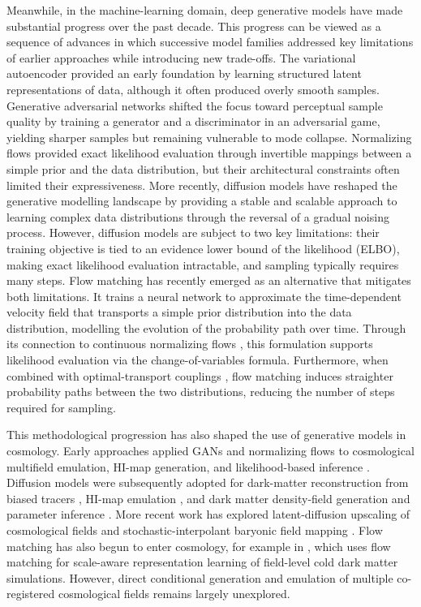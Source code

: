 \documentclass{article}
\begin{document}
Meanwhile, in the machine-learning domain, deep generative models
have made substantial progress over the past decade. This progress
can be viewed as a sequence of advances in which successive model
families addressed key limitations of earlier approaches while
introducing new trade-offs. The variational autoencoder \citep[VAE;][]{Kingma2014} 
provided an early foundation by learning structured latent representations of
data, although it often produced overly smooth samples. Generative adversarial networks
\citep[GANs;][]{Goodfellow2014} shifted the focus toward perceptual
sample quality by training a generator and a discriminator in an
adversarial game, yielding sharper samples but
remaining vulnerable to mode collapse. Normalizing flows \citep{RezendeMohamed2015}
provided exact likelihood evaluation through invertible mappings
between a simple prior and the data distribution, but their
architectural constraints often limited their expressiveness.
More recently, diffusion models \citep{Ho2020,Song2021} have reshaped the generative modelling 
landscape by providing a stable and scalable approach to learning complex data
distributions through the reversal of a gradual noising process. 
However, diffusion models are subject to two key limitations: 
their training objective is tied to an evidence lower bound of the likelihood (ELBO), 
making exact likelihood evaluation intractable, and sampling typically requires many steps.
Flow matching \citep{Lipman2023} has recently emerged as an
alternative that mitigates both limitations. It trains a
neural network to approximate the time-dependent velocity field that
transports a simple prior distribution into the data distribution,
modelling the evolution of the probability path over time. Through
its connection to continuous normalizing flows \citep{Chen2018}, this
formulation supports likelihood evaluation via the
change-of-variables formula. Furthermore, when combined with
optimal-transport couplings \citep{Lipman2023}, flow matching induces
straighter probability paths between the two distributions, reducing
the number of steps required for sampling.

This methodological progression has also shaped the use of generative
models in cosmology. Early approaches applied GANs and normalizing
flows to cosmological multifield emulation, HI-map generation, and
likelihood-based inference
\citep{Andrianomena2022,Andrianomena2024,Hassan2021HIFlow,Friedman2022HIGlow}.
Diffusion models were subsequently adopted for dark-matter
reconstruction from biased tracers
\citep{Park2023Diffusion,Ono2024Debiasing}, HI-map emulation
\citep{Hassan2023HIDM}, and dark matter density-field generation and
parameter inference \citep{Mudur2024,Mudur2024DiffHMC}. More recent
work has explored latent-diffusion upscaling of cosmological fields
\citep{Mishra2026} and stochastic-interpolant baryonic field mapping
\citep{Horowitz2025}. Flow matching has also begun to enter cosmology, for example in
\citet{Kannan2025}, which uses flow matching for scale-aware
representation learning of field-level cold dark matter simulations.
However, direct conditional generation and emulation of multiple
co-registered cosmological fields remains largely unexplored.
\end{document}
